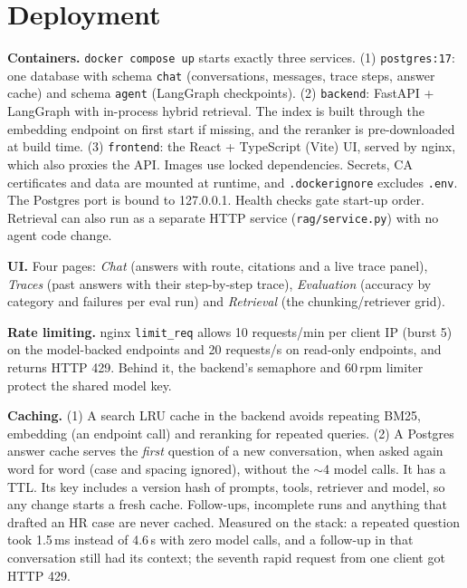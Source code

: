\section{Deployment}
\label{sec:deploy}
\textbf{Containers.} \texttt{docker compose up} starts exactly three services. (1) \texttt{postgres:17}: one
database with schema \texttt{chat} (conversations, messages, trace steps, answer cache) and schema \texttt{agent}
(LangGraph checkpoints). (2) \texttt{backend}: FastAPI + LangGraph with in-process hybrid retrieval. The index is
built through the embedding endpoint on first start if missing, and the reranker is pre-downloaded at build time.
(3) \texttt{frontend}: the React + TypeScript (Vite) UI, served by nginx, which also proxies the API. Images use
locked dependencies. Secrets, CA certificates and data are mounted at runtime, and \texttt{.dockerignore} excludes
\texttt{.env}. The Postgres port is bound to 127.0.0.1. Health checks gate start-up order. Retrieval can also run as
a separate HTTP service (\texttt{rag/service.py}) with no agent code change.

\textbf{UI.} Four pages: \emph{Chat} (answers with route, citations and a live trace panel), \emph{Traces} (past
answers with their step-by-step trace), \emph{Evaluation} (accuracy by category and failures per eval run) and
\emph{Retrieval} (the chunking/retriever grid).

\textbf{Rate limiting.} nginx \texttt{limit\_req} allows 10 requests/min per client IP (burst 5) on the
model-backed endpoints and 20 requests/s on read-only endpoints, and returns HTTP 429. Behind it, the backend's
semaphore and 60\,rpm limiter protect the shared model key.

\textbf{Caching.} (1) A search LRU cache in the backend avoids repeating BM25, embedding (an endpoint call) and
reranking for repeated queries. (2) A Postgres answer cache serves the \emph{first} question of a new
conversation, when asked again word for word (case and spacing ignored), without the $\sim$4 model calls. It has a
TTL. Its key includes a version hash of prompts, tools, retriever and model, so any change starts a fresh cache.
Follow-ups, incomplete runs and anything that drafted an HR case are never cached. Measured on the stack: a repeated question took 1.5\,ms instead of 4.6\,s with zero model calls,
and a follow-up in that conversation still had its context; the seventh rapid request from one client got HTTP 429.
